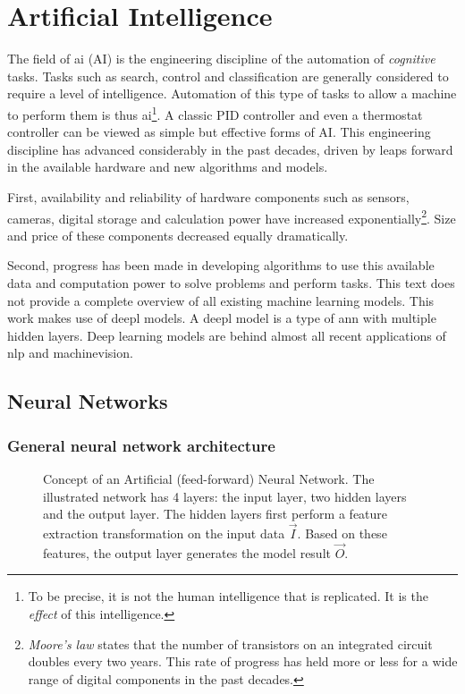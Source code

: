 \section{Artificial Intelligence}
\par{
    The field of \Gls{ai} (AI) is the engineering discipline of the automation of \textit{cognitive} tasks.
    Tasks such as search, control and classification are generally considered to require a level of intelligence. 
    Automation of this type of tasks to allow a machine to perform them is thus \Gls{ai}\footnote{To be precise, it is not the human intelligence that is replicated. It is the \textit{effect} of this intelligence.}.
    A classic PID controller and even a thermostat controller can be viewed as simple but effective forms of AI.
    This engineering discipline has advanced considerably in the past decades, driven by leaps forward in the available hardware and new algorithms and models. 
}
\par{
    First, availability and reliability of hardware components such as sensors, cameras, digital storage and calculation power have increased exponentially\footnote{ 
        \textit{Moore's law} states that the number of transistors on an integrated circuit doubles every two years. This rate of progress has held more or less for a wide range of digital components in the past decades.}.
    Size and price of these components decreased equally dramatically. }
\par{
    Second, progress has been made in developing algorithms to use this available data and computation power to solve problems and perform tasks.
    This text does not provide a complete overview of all existing machine learning models. 
    This work makes use of \Gls{deepl} models.
    A \Gls{deepl} model is a type of \acrfull{ann} with multiple hidden layers. 
    Deep learning models are behind almost all recent applications of \acrfull{nlp} and \Gls{machinevision}.
}

\subsection{Neural Networks}
\subsubsection{General neural network architecture}

\begin{figure}
    \centering
    
    \caption{
        Concept of an Artificial (feed-forward) Neural Network. 
        The illustrated network has 4 layers: the input layer, two hidden layers and the output layer.
        The hidden layers first perform a feature extraction transformation on the input data $\vec{I}$.
        Based on these features, the output layer generates the model result $\vec{O}$.
        \label{fig:ann}
        }
\end{figure}

